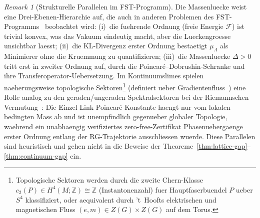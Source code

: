 \documentclass[12pt,a4paper]{article}
\theoremstyle{definition}
\theoremstyle{plain}
\theoremstyle{remark}
\newtheorem{remark}[definition]{Remark}
\begin{document}
\begin{remark}[Strukturelle Parallelen im FST-Programm]\label{rem:fst-parallels}
Die Massenluecke weist eine Drei-Ebenen-Hierarchie auf, die auch in
anderen Problemen des FST-Programms~\cite{FST-Unified2026} beobachtet wird: (i)~die
fuehrende Ordnung (freie Energie $\mathcal{F}$) ist trivial konvex, was
das Vakuum eindeutig macht, aber die Lueckengroesse unsichtbar laesst; (ii)~die
KL-Divergenz erster Ordnung bestaetigt $\mu_\Lambda$ als Minimierer ohne
die Kruemmung zu quantifizieren; (iii)~die Massenluecke $\Delta > 0$ tritt erst
in zweiter Ordnung auf, durch die Poincar\'e--Dobrushin-Schranke und ihre
Transferoperator-Uebersetzung. Im Kontinuumslimes spielen naeherungsweise
topologische Sektoren\footnote{Topologische Sektoren werden durch die zweite Chern-Klasse $c_2(P) \in H^4(M;\mathbb{Z}) \cong \mathbb{Z}$ (Instantonenzahl) fuer Hauptfaserbuendel $P$ ueber $S^4$ klassifiziert, oder aequivalent durch 't~Hoofts elektrischen und magnetischen Fluss $(e, m) \in Z(G) \times Z(G)$ auf dem Torus.} (definiert ueber Gradientenfluss~\cite{Luscher2010}) eine
Rolle analog zu den geraden/ungeraden Spektralsektoren bei der
Riemannschen Vermutung~\cite{GeigerRH2026c}: Die Einzel-Link-Poincar\'e-Konstante
haengt nur vom lokalen bedingten Mass ab und ist unempfindlich gegenueber
globaler Topologie, waehrend ein unabhaengig verifiziertes zero-free-Zertifikat
Phasenuebergaenge erster Ordnung entlang der RG-Trajektorie ausschliessen wuerde.
Diese Parallelen sind heuristisch und gehen nicht in die Beweise der
Theoreme~\ref{thm:lattice-gap}--\ref{thm:continuum-gap} ein.
\end{remark}
\end{document}
